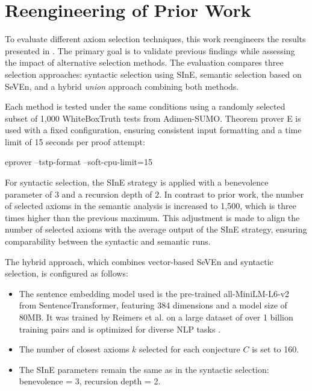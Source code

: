 \documentclass[english,version-2020-11]{uzl-thesis}
\begin{document}
\section{Reengineering of Prior Work}

To evaluate different axiom selection techniques, this work reengineers the results presented in \cite{Schon2024}. The primary goal is to validate previous findings while assessing the impact of alternative selection methods. The evaluation compares three selection approaches: syntactic selection using SInE, semantic selection based on SeVEn, and a hybrid \textit{union} approach combining both methods.

Each method is tested under the same conditions using a randomly selected subset of 1,000 WhiteBoxTruth tests from Adimen-SUMO. Theorem prover E is used with a fixed configuration, ensuring consistent input formatting and a time limit of 15 seconds per proof attempt:

\begin{Pseudocode}[morekeywords = {add, create}, deletekeywords={to}, numbers=left,
    caption = {Command to run Prover E}]
    eprover --tstp-format --soft-cpu-limit=15
\end{Pseudocode}

For syntactic selection, the SInE strategy is applied with a benevolence parameter of 3 and a recursion depth of 2. In contrast to prior work, the number of selected axioms in the semantic analysis is increased to 1,500, which is three times higher than the previous maximum. This adjustment is made to align the number of selected axioms with the average output of the SInE strategy, ensuring comparability between the syntactic and semantic runs.

The hybrid approach, which combines vector-based SeVEn and syntactic selection, is configured as follows:

\begin{itemize}
    \item The sentence embedding model used is the pre-trained all-MiniLM-L6-v2 from SentenceTransformer, featuring 384 dimensions and a model size of 80MB. It was trained by Reimers et al. on a large dataset of over 1 billion training pairs and is optimized for diverse NLP tasks \cite{Reimers2019, Sentencetransformers2019}.
    \item The number of closest axioms \( k \) selected for each conjecture \( C \) is set to 160.
    \item The SInE parameters remain the same as in the syntactic selection: benevolence = 3, recursion depth = 2.
\end{itemize}
\end{document}
